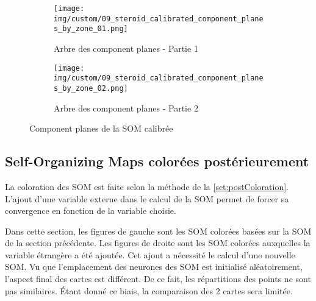    \begin{figure}[H]
        \begin{subfigure}[b]{\textwidth}
            \centering
            \texttt{[image: img/custom/09\_steroid\_calibrated\_component\_planes\_by\_zone\_01.png]}    
            \caption{Arbre des component planes - Partie 1}
            \label{fig:calibratedCp1}
        \end{subfigure}

        \begin{subfigure}[b]{\textwidth}
            \centering
            \texttt{[image: img/custom/09\_steroid\_calibrated\_component\_planes\_by\_zone\_02.png]}    
            \caption{Arbre des component planes - Partie 2}
            \label{fig:calibratedCp2}
        \end{subfigure}

        \caption{Component planes de la SOM calibrée}
        \label{fig:calibratedCpTree}
    \end{figure}

\subsection{Self-Organizing Maps colorées postérieurement}
\label{sct:coloredSOM}




    La coloration des SOM est faite selon la méthode de la \autoref{sct:postColoration}. L'ajout d'une variable externe dans le calcul de la SOM permet de forcer sa convergence en fonction de la variable choisie. 

    Dans cette section, les figures de gauche sont les SOM colorées basées sur la SOM de la section précédente. Les figures de droite sont les SOM colorées auxquelles la variable étrangère a été ajoutée. Cet ajout a nécessité le calcul d'une nouvelle SOM. Vu que l'emplacement des neurones des SOM est initialisé aléatoirement, l'aspect final des cartes est différent. De ce fait, les répartitions des points ne sont pas similaires. Étant donné ce biais, la comparaison des 2 cartes sera limitée.

